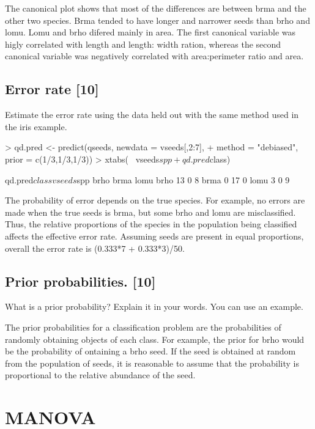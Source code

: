 \documentclass{article}
\begin{document}
The canonical plot shows that most of the differences are between brma and the other two species. Brma tended to have longer and narrower seeds than brho and lomu. Lomu and brho difered mainly in area. The first canonical variable was higly correlated with length and length: width ration, whereas the second canonical variable was negatively correlated with area:perimeter ratio and area.

\subsection{Error rate [10]}

Estimate the error rate using the data held out with the same method used in the iris example.

\begin{Schunk}
\begin{Sinput}
> qd.pred <- predict(qseeds, newdata = vseeds[,2:7],
+                     method = "debiased", prior = c(1/3,1/3,1/3))
> xtabs(~ vseeds$spp + qd.pred$class)
\end{Sinput}
\begin{Soutput}
          qd.pred$class
vseeds$spp brho brma lomu
      brho   13    0    8
      brma    0   17    0
      lomu    3    0    9
\end{Soutput}
\end{Schunk}

The probability of error depends on the true species. For example, no errors are made when the true seeds is brma, but some brho and lomu are misclassified. Thus, the relative proportions of the species in the population being classified affects the effective error rate. Assuming seeds are present in equal proportions, overall the error rate is (0.333*7 + 0.333*3)/50.

\subsection{Prior probabilities. [10]}
What is a prior probability? Explain it in your words. You can use an example.

The prior probabilities for a classification problem are the probabilities of randomly obtaining objects of each class. For example, the prior for brho would be the probability of ontaining a brho seed. If the seed is obtained at random from the population of seeds, it is reasonable to assume that the probability is proportional to the relative abundance of the seed.

\section{MANOVA}
\end{document}
